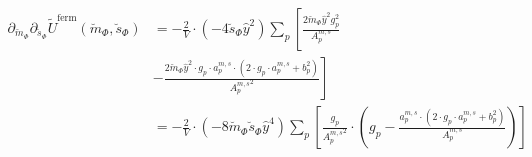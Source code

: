 \begin{align} \label{eq:CEP_derivative_dmds_fermionicContribution_rescaled}
 \partial_{\breve m_{\Phi}} \partial_{\breve s_{\Phi}}  \tilde U^{\text{ferm}}(\breve m_{\Phi}, \breve s_{\Phi}) & = 
                                    - \frac{2}{V} \cdot (-4 \breve s_{\Phi}\hat y^2) \sum\limits_p \left[ \frac{ 2 \breve m_{\Phi} \hat y^2 g_p^2}{ {A_p^{m, s}} } \right. 
      \nonumber \\
                                  & - \left. \frac{ 2 \breve m_{\Phi} \hat y^2 \cdot g_p \cdot {a_p^{m,s}} \cdot \left( 2 \cdot g_p\cdot {a_p^{m,s}} + b_p^2 \right)}
                                      { {A_p^{m, s}}^2 } \right] 
      \nonumber \\
                                  & = - \frac{2}{V} \cdot (-8 \breve m_{\Phi} \breve s_{\Phi}\hat y^4) \sum\limits_p 
                                      \left[ \frac{g_p}{ {A_p^{m, s}}^2 } \cdot \left( g_p  - \frac{ {a_p^{m,s}} \cdot \left( 2 \cdot g_p\cdot {a_p^{m,s}} + b_p^2 \right)}
                                      { {A_p^{m, s}} }\right) \right] 
\end{align}
% 
% 
